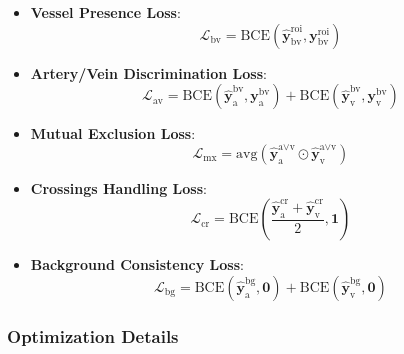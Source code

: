 \documentclass{article}
\begin{document}
\begin{itemize}
    \item \textbf{Vessel Presence Loss}:
        \begin{equation}
        \mathcal{L}_{\text{bv}} = \text{BCE}(\hat{\textbf{y}}^\text{roi}_\text{bv}, \textbf{y}^\text{roi}_\text{bv})
        \end{equation}

    \item \textbf{Artery/Vein Discrimination Loss}:
        \begin{equation}
        \mathcal{L}_{\text{av}} = \text{BCE}(\hat{\textbf{y}}^\text{bv}_\text{a}, \textbf{y}^\text{bv}_\text{a}) + \text{BCE}(\hat{\textbf{y}}^\text{bv}_\text{v}, \textbf{y}^\text{bv}_\text{v})
        \end{equation}

    \item \textbf{Mutual Exclusion Loss}:
        \begin{equation}
        \mathcal{L}_{\text{mx}} =  \text{avg}\left(\hat{\textbf{y}}_\text{a}^{\text{a}\vee\text{v}} \odot \hat{\textbf{y}}_\text{v}^{\text{a}\vee\text{v}}\right)
        \end{equation}

    \item \textbf{Crossings Handling Loss}:
        \begin{equation}
        \mathcal{L}_{\text{cr}} = \text{BCE}\left(\frac{\hat{\textbf{y}}^\text{cr}_\text{a} + \hat{\textbf{y}}^\text{cr}_\text{v}}{2}, \textbf{1}\right)
        \end{equation}

    \item \textbf{Background Consistency Loss}:
    \begin{equation}
        \mathcal{L}_{\text{bg}} = \text{BCE}(\hat{\textbf{y}}_\text{a}^{\text{bg}}, \mathbf{0}) + \text{BCE}(\hat{\textbf{y}}_\text{v}^{\text{bg}}, \mathbf{0})
    \end{equation}
\end{itemize}


\subsubsection*{Optimization Details}
\end{document}
